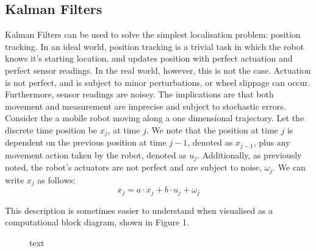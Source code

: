 \documentclass[a4paper]{article}
\begin{document}
\subsection{Kalman Filters}
Kalman Filters can be used to solve the simplest localisation problem: position tracking. In an ideal world, position tracking is a trivial task in which the robot knows it's starting location, and updates position with perfect actuation and perfect sensor readings. In the real world, however, this is not the case. Actuation is not perfect, and is subject to minor perturbations, or wheel slippage can occur. Furthermore, sensor readings are noisey. The implications are that both movement and measurement are imprecise and subject to stochastic errors. Consider the a mobile robot moving along a one dimensional trajectory. Let the discrete time position be $x_j$, at time $j$. We note that the position at time $j$ is dependent on the previous position at time $j-1$, denoted as $x_{j-1}$, plus any movement action taken by the robot, denoted as $u_j$. Additionally, as previously noted, the robot's actuators are not perfect and are subject to noise, $\omega_j$. We can write $x_j$ as follows:
\begin{equation}
x_j = a \cdot x_j + b \cdot u_j + \omega_j
\end{equation}

This description is sometimes easier to understand when visualised as a computational block diagram, shown in Figure 1.
\begin{figure}[h]
\centering
{}
\caption{text}
\end{figure}
\end{document}
